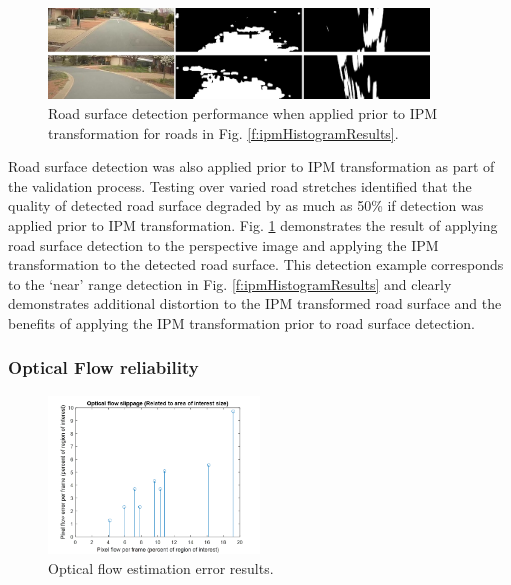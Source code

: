\documentclass[]{aiaa-tc}%
\begin{document}
\begin{figure}[h!]{}
	\centering
	\includegraphics[width=0.9\textwidth]{Results/ipmHistorgramReverse.png}
	\caption{Road surface detection performance when applied prior to IPM transformation for roads in Fig. \ref{f:ipmHistogramResults}.}
	\label{f:ipmHistorgramReverse}
\end{figure}


Road surface detection was also applied prior to IPM transformation as part of the validation process. Testing over varied road stretches identified that the quality of detected road surface degraded by as much as 50\% if detection was applied prior to IPM transformation. Fig. \ref{f:ipmHistorgramReverse} demonstrates the result of applying road surface detection to the perspective image and applying the IPM transformation to the detected road surface. This detection example corresponds to the `near' range detection in Fig. \ref{f:ipmHistogramResults} and clearly demonstrates additional distortion to the IPM transformed road surface and the benefits of applying the IPM transformation prior to road surface detection.


\subsubsection{Optical Flow reliability}\label{s:performance:opticalflow}

\begin{figure} 
	\centering
	\includegraphics[width=0.5\textwidth]{Results/opticalFlowResults.png}
	\caption{Optical flow estimation error results.}
	\label{f:opticalFlowResults}
\end{figure}
\end{document}
